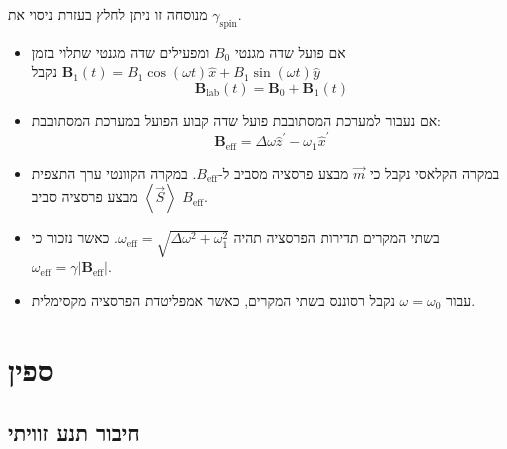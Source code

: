 \documentclass{tstextbook}
\begin{document}
\begin{remark}
מנוסחה זו ניתן לחלץ בעזרת ניסוי את \(\gamma_{\text{spin}}\).

\end{remark}
\begin{summary}
  \begin{itemize}
    \item אם פועל שדה מגנטי \(B_{0}\) ומפעילים שדה מגנטי שתלוי בזמן \(\mathbf{B}_{1}(t)=B_{1}\cos(\omega t){\hat{x}}+B_{1}\sin(\omega t){\hat{y}}\) נקבל
$$\mathbf{B}_{\mathrm{lab}}(t)=\mathbf{B}_{0}+\mathbf{B}_{1}(t)$$
    \item אם נעבור למערכת המסתובבת פועל שדה קבוע הפועל במערכת המסתובבת:
$$\mathbf{B}_{\mathrm{eff}}=\Delta\omega\hat{z}^{\prime}-\omega_{1}\hat{x}^{\prime}$$
    \item במקרה הקלאסי נקבל כי \(\vec{m}\) מבצע פרסציה מסביב ל-\(B_{\text{eff}}\). במקרה הקוונטי ערך התצפית \(\left\langle  \vec{S}  \right\rangle\) מבצע פרסציה סביב \(B_{\mathrm{eff}}\).
    \item בשתי המקרים תדירות הפרסציה תהיה \(\omega_{\mathrm{eff}}=\sqrt{ \Delta \omega^{2}+\omega_{1}^{2} }\). כאשר נזכור כי \(\omega_{\mathrm{eff}}=\gamma|\mathbf{B}_{\mathrm{eff}}|\).
    \item עבור \(\omega=\omega_{0}\) נקבל רסוננס בשתי המקרים, כאשר אמפליטדת הפרסציה מקסימלית.
  \end{itemize}
\end{summary}
\chapter{ספין}

\section{חיבור תנע זוויתי}
\end{document}
